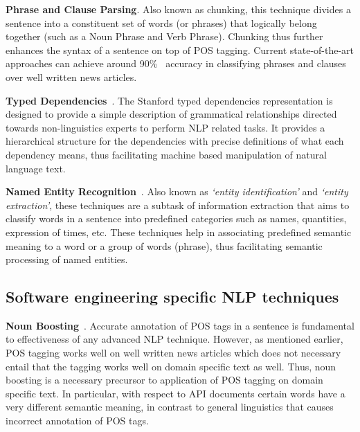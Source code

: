 \textbf{Phrase and Clause Parsing}. Also known as chunking, this technique divides a sentence into a constituent set of words (or phrases) that logically belong together (such as a Noun Phrase and Verb Phrase). Chunking thus further enhances the syntax of a sentence on top of POS tagging. Current state-of-the-art approaches can achieve around 90\%~\cite{SNLP1} accuracy in classifying phrases and clauses over well written news articles.

\textbf{Typed Dependencies}~\cite{Marneffe06LREC,Marneffe08COLING}. The Stanford typed dependencies representation  is designed to provide a simple description of grammatical relationships directed towards non-linguistics experts to perform NLP related tasks. It provides a hierarchical structure for the dependencies with precise definitions of what each dependency means, thus facilitating machine based manipulation of natural language text.

\textbf{Named Entity Recognition}~\cite{Finkel05ACL}. Also known as \textit{`entity identification'} and \textit{`entity extraction'}, these techniques are a subtask of information extraction that aims to classify words in a sentence into predefined categories such as names, quantities, expression of times, etc. These techniques help in associating predefined semantic meaning to a word or a group of words (phrase), thus facilitating semantic processing of named entities. 



\subsection{Software engineering specific NLP techniques}
\label{sub:SENLPback}

\textbf{Noun Boosting}~\cite{pandita12:inferring}. Accurate annotation of POS tags in a sentence is fundamental to effectiveness of any advanced NLP technique.
However, as mentioned earlier, POS tagging works well on well written news articles which does not necessary entail that the tagging works well on domain specific text as well.
Thus, noun boosting is a necessary precursor to application of POS tagging on domain specific text.
In particular, with respect to API documents certain words have a very different semantic meaning, in contrast to general linguistics that causes incorrect annotation of POS tags.

